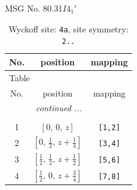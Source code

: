 \documentclass[fleqn,8pt]{jsarticle}
\begin{document}
\setcounter{MaxMatrixCols}{32}

\renewcommand{\tablename}{Table~}
\renewcommand{\figurename}{Figure~}
\begin{center}
\LARGE
MSG No. 80.31\quad$I4_{1}'$
\end{center}
\renewcommand{\arraystretch}{1.2}
\begin{longtable}{ccc}
\caption{Wyckoff site: {\tt 4a}, site symmetry: {\tt 2..}}
 \\
 \hline \hline
No. & position & mapping \\ \hline \endfirsthead

\multicolumn{2}{l}{\tablename\ \thetable{}} \\
 \hline \hline
No. & position & mapping \\ \hline \endhead

 \hline \hline
\multicolumn{2}{r}{\footnotesize\it continued ...} \\ \endfoot

 \hline \hline
\multicolumn{2}{r}{} \\ \endlastfoot

1 & $\left[ 0,\, 0,\, z \right]$ & {\tt [1,2]} \\ \hline
2 & $\left[ 0,\, \frac{1}{2},\, z + \frac{1}{4} \right]$ & {\tt [3,4]} \\ \hline
3 & $\left[ \frac{1}{2},\, \frac{1}{2},\, z + \frac{1}{2} \right]$ & {\tt [5,6]} \\ \hline
4 & $\left[ \frac{1}{2},\, 0,\, z + \frac{3}{4} \right]$ & {\tt [7,8]} \\
\end{longtable}
\renewcommand{\arraystretch}{1.2}
\end{document}
